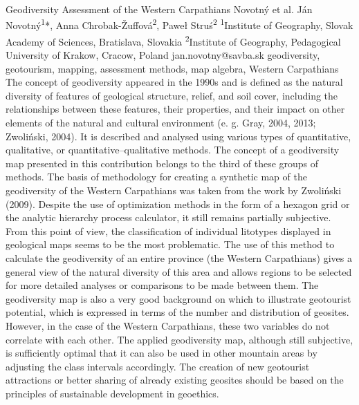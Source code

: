 \abstract
{Geodiversity Assessment of the Western Carpathians} 
{Novotný et al.} 
{Ján Novotný\textsuperscript{1}*, Anna Chrobak-Žuffová\textsuperscript{2}, Paweł Struś\textsuperscript{2}} 
{\TLtag} 
{
\textsuperscript{1}Institute of Geography, Slovak Academy of Sciences, Bratislava, Slovakia
\textsuperscript{2}Institute of Geography, Pedagogical University of Krakow, Cracow, Poland
}
{jan.novotny@savba.sk}  %
{geodiversity, geotourism, mapping, assessment methods, map algebra, Western Carpathians}
{
The concept of geodiversity appeared in the 1990s and is defined as the natural diversity of features of geological structure, relief, and soil cover, including the relationships between these features, their properties, and their impact on other elements of the natural and cultural environment (e. g. Gray, 2004, 2013; Zwoliński, 2004). It is described and analysed using various types of quantitative, qualitative, or quantitative–qualitative methods. The concept of a geodiversity map presented in this contribution belongs to the third of these groups of methods. The basis of methodology for creating a synthetic map of the geodiversity of the Western Carpathians was taken from the work by Zwoliński (2009). Despite the use of optimization methods in the form of a hexagon grid or the analytic hierarchy process calculator, it still remains partially subjective. From this point of view, the classification of individual litotypes displayed in geological maps seems to be the most problematic. The use of this method to calculate the geodiversity of an entire province (the Western Carpathians) gives a general view of the natural diversity of this area and allows regions to be selected for more detailed analyses or comparisons to be made between them. The geodiversity map is also a very good background on which to illustrate geotourist potential, which is expressed in terms of the number and distribution of geosites. However, in the case of the Western Carpathians, these two variables do not correlate with each other. The applied geodiversity map, although still subjective, is sufficiently optimal that it can also be used in other mountain areas by adjusting the class intervals accordingly. The creation of new geotourist attractions or better sharing of already existing geosites should be based on the principles of sustainable development in geoethics.
}
